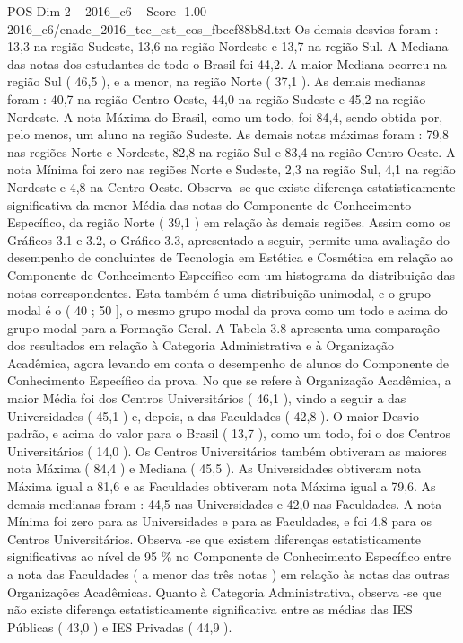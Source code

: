 \begin{textsample}{POS Dim 2 – 2016\_c6 – Score -1.00 – 2016\_c6/enade\_2016\_tec\_est\_cos\_fbccf88b8d.txt}
Os demais desvios foram : 13,3 na região Sudeste, 13,6 na região Nordeste e 13,7 na região Sul.
A Mediana das notas dos estudantes de todo o Brasil foi 44,2.
A maior Mediana ocorreu na região Sul ( 46,5 ), e a menor, na região Norte ( 37,1 ).
As demais medianas foram : 40,7 na região Centro-Oeste, 44,0 na região Sudeste e 45,2 na região Nordeste.
A nota Máxima do Brasil, como um todo, foi 84,4, sendo obtida por, pelo menos, um aluno na região Sudeste.
As demais notas máximas foram : 79,8 nas regiões Norte e Nordeste, 82,8 na região Sul e 83,4 na região Centro-Oeste.
A nota Mínima foi zero nas regiões Norte e Sudeste, 2,3 na região Sul, 4,1 na região Nordeste e 4,8 na Centro-Oeste.
Observa -se que existe diferença estatisticamente significativa da menor Média das notas do Componente de Conhecimento Específico, da região Norte ( 39,1 ) em relação às demais regiões.
Assim como os Gráficos 3.1 e 3.2, o Gráfico 3.3, apresentado a seguir, permite uma avaliação do desempenho de concluintes de Tecnologia em Estética e Cosmética em relação ao Componente de Conhecimento Específico com um histograma da distribuição das notas correspondentes.
Esta também é uma distribuição unimodal, e o grupo modal é o ( 40 ; 50 ], o mesmo grupo modal da prova como um todo e acima do grupo modal para a Formação Geral.
A Tabela 3.8 apresenta uma comparação dos resultados em relação à Categoria Administrativa e à Organização Acadêmica, agora levando em conta o desempenho de alunos do Componente de Conhecimento Específico da prova.
No que se refere à Organização Acadêmica, a maior Média foi dos Centros Universitários ( 46,1 ), vindo a seguir a das Universidades ( 45,1 ) e, depois, a das Faculdades ( 42,8 ).
O maior Desvio padrão, e acima do valor para o Brasil ( 13,7 ), como um todo, foi o dos Centros Universitários ( 14,0 ).
Os Centros Universitários também obtiveram as maiores nota Máxima ( 84,4 ) e Mediana ( 45,5 ).
As Universidades obtiveram nota Máxima igual a 81,6 e as Faculdades obtiveram nota Máxima igual a 79,6.
As demais medianas foram : 44,5 nas Universidades e 42,0 nas Faculdades.
A nota Mínima foi zero para as Universidades e para as Faculdades, e foi 4,8 para os Centros Universitários.
Observa -se que existem diferenças estatisticamente significativas ao nível de 95 \% no Componente de Conhecimento Específico entre a nota das Faculdades ( a menor das três notas ) em relação às notas das outras Organizações Acadêmicas.
Quanto à Categoria Administrativa, observa -se que não existe diferença estatisticamente significativa entre as médias das IES Públicas ( 43,0 ) e IES Privadas ( 44,9 ).

\end{textsample}
